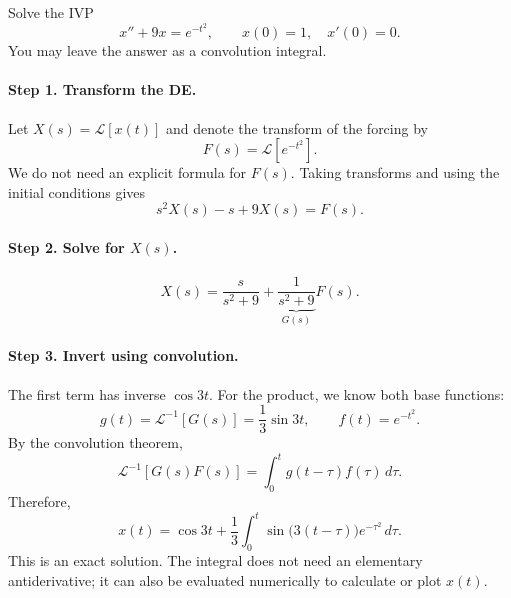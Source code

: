 \documentclass[10pt,letterpaper]{article}
\begin{document}
\begin{example}[5]{
Solve the IVP
\[
x''+9x=e^{-t^2},\qquad x(0)=1,\quad x'(0)=0.
\]
You may leave the answer as a convolution integral.
}

\paragraph{Step 1. Transform the DE.}
Let $X(s)=\mathcal L[x(t)]$ and denote the transform
of the forcing by
\[
F(s)=\mathcal L[e^{-t^2}].
\]
We do not need an explicit formula for $F(s)$.
Taking transforms and using the initial conditions gives
\[
s^2X(s)-s+9X(s)=F(s).
\]

\paragraph{Step 2. Solve for $X(s)$.}
\[
X(s)=\frac{s}{s^2+9}
+\underbrace{\frac{1}{s^2+9}}_{G(s)}F(s).
\]

\paragraph{Step 3. Invert using convolution.}
The first term has inverse $\cos3t$. For the product,
we know both base functions:
\[
g(t)=\mathcal L^{-1}[G(s)]=\frac13\sin3t,
\qquad
f(t)=e^{-t^2}.
\]
By the convolution theorem,
\[
\mathcal L^{-1}[G(s)F(s)]
=\int_0^t g(t-\tau)f(\tau)\,d\tau.
\]
Therefore,
\[
\boxed{
x(t)=\cos3t+
\frac13\int_0^t
\sin\bigl(3(t-\tau)\bigr)e^{-\tau^2}\,d\tau.
}
\]
This is an exact solution. The integral does not need an elementary antiderivative; it can also be evaluated numerically to calculate or plot $x(t)$.

\end{example}
\end{document}
